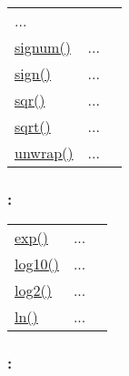 \begin{tabular}{>{\raggedleft}p{3cm}>{\centering}p{0.5cm}l}
...&
 \begin{NoHyper} \nameref{par:Real} \end{NoHyper}\tabularnewline
\textcolor{blue}{\hyperlink{signum}{signum()}}&
...&
 \begin{NoHyper} \nameref{par:Signum} \end{NoHyper}\tabularnewline
\textcolor{blue}{\hyperlink{sign}{sign()}}&
...&
 \begin{NoHyper} \nameref{par:Sign} \end{NoHyper}\tabularnewline
\textcolor{blue}{\hyperlink{sqr}{sqr()}}&
...&
 \begin{NoHyper} \nameref{par:Square} \end{NoHyper}\tabularnewline
\textcolor{blue}{\hyperlink{sqrt}{sqrt()}}&
...&
 \begin{NoHyper} \nameref{par:Square-root} \end{NoHyper}\tabularnewline
\textcolor{blue}{\hyperlink{unwrap}{unwrap()}}&
...&
 \begin{NoHyper} \nameref{par:Unwrap} \end{NoHyper}\tabularnewline
\end{tabular}


\subsubsection*{: }

\textcolor{blue}{}\begin{tabular}{>{\raggedleft}p{3cm}>{\centering}p{0.5cm}l}
\textcolor{blue}{\hyperlink{exp}{exp()}}&
...&
 \begin{NoHyper} \nameref{par:Exponential-function} \end{NoHyper}\tabularnewline
\textcolor{blue}{\hyperlink{log10}{log10()}}&
...&
 \begin{NoHyper} \nameref{par:Decimal-logarithm} \end{NoHyper}\tabularnewline
\textcolor{blue}{\hyperlink{log2}{log2()}}&
...&
 \begin{NoHyper} \nameref{par:Binary-logarithm} \end{NoHyper}\tabularnewline
\textcolor{blue}{\hyperlink{ln}{ln()}}&
...&
 \begin{NoHyper} \nameref{par:Natural-logarithm} \end{NoHyper}\tabularnewline
\end{tabular}


\subsubsection*{: }

